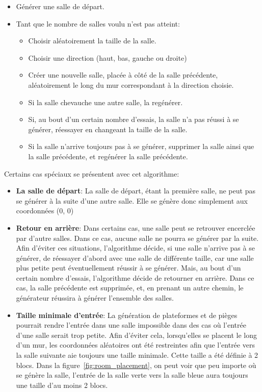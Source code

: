 \documentclass[10pt]{report}
\begin{document}
\begin{itemize}
  \item Générer une salle de départ.
  \item Tant que le nombre de salles voulu n'est pas atteint:
  \begin{itemize}
    \item Choisir aléatoirement la taille de la salle.
    \item Choisir une direction (haut, bas, gauche ou droite)
    \item Créer une nouvelle salle, placée à côté de la salle précédente,
    aléatoirement le long du mur correspondant à la direction choisie.
    \item Si la salle chevauche une autre salle, la regénérer.
    \item Si, au bout d'un certain nombre d'essais, la salle n'a pas réussi
    à se générer, réessayer en changeant la taille de la salle.
    \item Si la salle n'arrive toujours pas à se générer, supprimer la
    salle ainsi que la salle précédente, et regénérer la salle précédente.
  \end{itemize}
\end{itemize}

Certains cas spéciaux se présentent avec cet algorithme:
\begin{itemize}
  \item \textbf{La salle de départ}: La salle de départ, étant la première
  salle, ne peut pas se générer à la suite d'une autre salle.
  Elle se génère donc simplement aux coordonnées (0, 0)
  \item \textbf{Retour en arrière}: Dans certains cas, une salle peut se 
  retrouver encerclée par d'autre salles.
  Dans ce cas, aucune salle ne pourra se générer par la suite.
  Afin d'éviter ces situations, l'algorithme décide, si une salle n'arrive pas à se générer, de réessayer
  d'abord avec une salle de différente taille, car une salle plus petite
  peut éventuellement réussir à se générer.
  Mais, au bout d'un certain nombre d'essais, l'algorithme décide de retourner en arrière.
  Dans ce cas, la salle précédente est supprimée, et, en prenant un autre chemin,
  le générateur réussira à générer l'ensemble des salles.
  \item \textbf{Taille minimale d'entrée}: La génération de plateformes et 
  de pièges pourrait rendre l'entrée dans une salle impossible dans des cas
  où l'entrée d'une salle serait trop petite.
  Afin d'éviter cela, lorsqu'elles se placent le long d'un mur, les coordonnées aléatoires ont
  été restreintes afin que l'entrée vers la salle suivante aie toujours
  une taille minimale.
  Cette taille a été définie à 2 blocs.
  Dans la figure~\ref{fig:room_placement}, on peut voir que peu importe où se génère la
  salle, l'entrée de la salle verte vers la salle bleue aura toujours une
  taille d'au moins 2 blocs.
\end{itemize}
\end{document}
